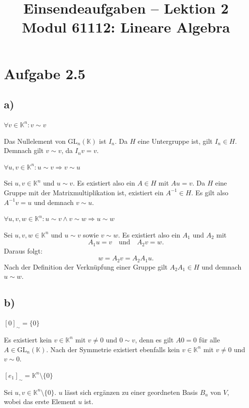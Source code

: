 \documentclass[a4paper,12pt]{article}
\title{Einsendeaufgaben -- Lektion 2\\[0.5em]
\large Modul 61112: Lineare Algebra}
\author{}
\date{}
\begin{document}
\maketitle

\section*{Aufgabe 2.5}

\subsection*{a)}

\underline{$\forall v \in \mathbb{K}^n: v \sim v$}

Das Nullelement von $\mathrm{GL}_n(\mathbb{K})$ ist $I_n$. Da $H$ eine Untergruppe ist, gilt $I_n \in H$.
Demnach gilt $v \sim v$, da $I_n v = v$.

\bigskip

\underline{$\forall u, v \in \mathbb{K}^n: u \sim v \Rightarrow v \sim u$}

Sei $u, v \in \mathbb{K}^n$ und $u \sim v$. Es existiert also ein $A \in H$ mit $Au = v$. Da $H$ eine Gruppe mit der Matrixmultiplikation ist, existiert ein $A^{-1} \in H$.
Es gilt also $A^{-1}v = u$ und demnach $v \sim u$.

\bigskip

\underline{$\forall u, v, w \in \mathbb{K}^n: u \sim v \land v \sim w \Rightarrow u \sim w$}

Sei $u, v, w \in \mathbb{K}^n$ und $u \sim v$ sowie $v \sim w$. Es existiert also ein $A_1$ und $A_2$ mit
\[
  A_1 u = v \quad \text{und} \quad A_2 v = w.
\]
Daraus folgt:
\[
  w = A_2 v = A_2 A_1 u.
\]
Nach der Definition der Verknüpfung einer Gruppe gilt $A_2 A_1 \in H$ und demnach $u \sim w$.

\subsection*{b)}

\textbf{$[0]_{\sim} = \{0\}$}

Es existiert kein $v \in \mathbb{K}^n$ mit $v \neq 0$ und $0 \sim v$, denn es gilt $A0 = 0$ für alle $A \in \mathrm{GL}_n(\mathbb{K})$.
Nach der Symmetrie existiert ebenfalls kein $v \in \mathbb{K}^n$ mit $v \neq 0$ und $v \sim 0$.

\bigskip

\textbf{$[e_1]_{\sim} = \mathbb{K}^n \setminus \{0\}$}

Sei $u, v \in \mathbb{K}^n \setminus \{0\}$. $u$ lässt sich ergänzen zu einer geordneten Basis $B_u$ von $V$, wobei das erste Element $u$ ist.
\end{document}
